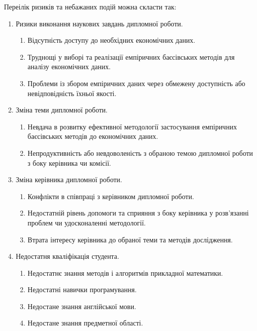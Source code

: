 \documentclass{mathreport}
\begin{document}
Переілік ризиків та небажаних подій можна скласти так:
\begin{enumerate}[label=R\arabic*.]
    \item Ризики виконання наукових завдань дипломної роботи.
    \begin{enumerate}[label=R\arabic{enumi}.\arabic{enumii}]
        \item Відсутність доступу до необхідних економічних даних.
        \item Труднощі у виборі та реалізації емпіричних баєсівських методів для аналізу економічних даних.
        \item Проблеми із збором емпіричних даних через обмежену доступність або невідповідність їхньої якості.
    \end{enumerate}
    \item Зміна теми дипломної роботи.
    \begin{enumerate}[label=R\arabic{enumi}.\arabic{enumii}]
        \item Невдача в розвитку ефективної методології застосування емпіричних баєсівських методів до економічних даних.
        \item Непродуктивність або невдоволеність з обраною темою дипломної роботи з боку керівника чи комісії.
    \end{enumerate}
    \item Зміна керівника дипломної роботи.
    \begin{enumerate}[label=R\arabic{enumi}.\arabic{enumii}]
        \item Конфлікти в співпраці з керівником дипломної роботи.
        \item Недостатній рівень допомоги та сприяння з боку керівника у розв'язанні проблем чи удосконаленні методології.
        \item Втрата інтересу керівника до обраної теми та методів дослідження.
    \end{enumerate}
    \item Недостатня кваліфікація студента.
    \begin{enumerate}[label=R\arabic{enumi}.\arabic{enumii}]
        \item Недостатнє знання методів і алгоритмів прикладної математики.
        \item Недостатні навички програмування.
        \item Недостане знання англійської мови.
        \item Недостане знання предметної області.
    \end{enumerate}

\end{enumerate}
\end{document}
